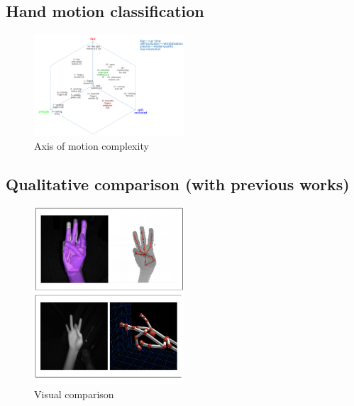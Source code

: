 \subsection{Hand motion classification}
\begin{figure}[h!] 
	\centering
	\includegraphics[width=0.5\textwidth]{fig/draft/draft_hand_motion_classification}
	\caption{Axis of motion complexity}
	\label{fig:modeling}
\end{figure}
\subsection{Qualitative comparison (with previous works)}
\begin{figure}[h!] 
	\centering
	\includegraphics[width=0.5\textwidth]{fig/draft/draft_visual_comparison}
	\caption{Visual comparison}
	\label{fig:modeling}
\end{figure}